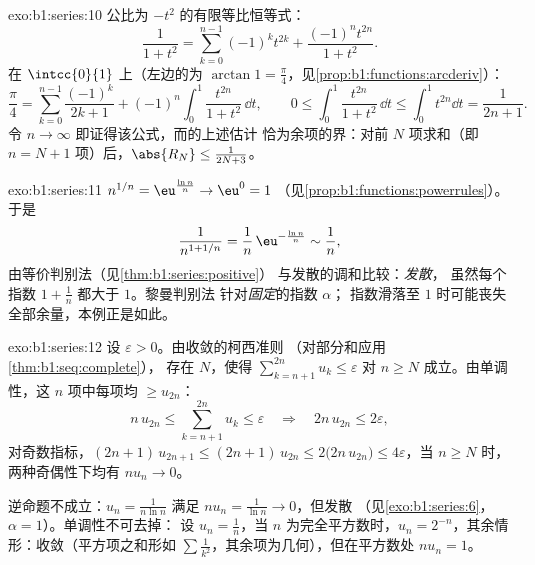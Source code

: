 \begin{solution}{exo:b1:series:10}
公比为 $-t^2$ 的有限等比恒等式：
\[
\frac{1}{1 + t^2} = \sum_{k=0}^{n-1} (-1)^k t^{2k}
+ \frac{(-1)^n t^{2n}}{1 + t^2} .
\]
在 $\intcc{0}{1}$ 上（左边的为 $\arctan
1 = \frac\pi4$，见\cref{prop:b1:functions:arcderiv}）：
\[
\frac{\pi}{4} = \sum_{k=0}^{n-1} \frac{(-1)^k}{2k+1}
+ (-1)^n \int_0^1 \frac{t^{2n}}{1+t^2}\,\dd t,
\qquad
0 \leq \int_0^1 \frac{t^{2n}}{1+t^2}\,\dd t \leq \int_0^1 t^{2n}\dd
t = \frac{1}{2n+1} .
\]
令 $n \to \infty$ 即证得该公式，而的上述估计
恰为余项的界：对前
$N$ 项求和（即 $n = N + 1$ 项）后，$\abs{R_N} \leq \frac{1}{2N + 3}$。
\end{solution}

\begin{solution}{exo:b1:series:11}
$n^{1/n} = \eu^{\frac{\ln n}{n}} \to \eu^0 = 1$
（见\cref{prop:b1:functions:powerrules}）。于是
\[
\frac{1}{n^{1 + 1/n}} = \frac{1}{n}\,\eu^{-\frac{\ln n}{n}}
\sim \frac{1}{n} ,
\]
由等价判别法（见\cref{thm:b1:series:positive}）
与发散的调和比较：\emph{发散}，
虽然每个指数 $1 + \frac1n$ 都大于 $1$。黎曼判别法
针对\emph{固定}的指数 $\alpha$；
指数滑落至 $1$ 时可能丧失全部余量，本例正是如此。
\end{solution}

\begin{solution}{exo:b1:series:12}
设 $\varepsilon > 0$。由收敛的柯西准则
（对部分和应用\cref{thm:b1:seq:complete}），
存在 $N$，使得 $\sum_{k=n+1}^{2n} u_k \leq
\varepsilon$ 对 $n \geq N$ 成立。由单调性，这 $n$ 项中每项均
$\geq u_{2n}$：
\[
n\,u_{2n} \leq \sum_{k=n+1}^{2n} u_k \leq \varepsilon
\quad\Longrightarrow\quad 2n\,u_{2n} \leq 2\varepsilon ,
\]
对奇数指标，$(2n+1)\,u_{2n+1} \leq (2n+1)\,u_{2n} \leq
2\bigl(2n\,u_{2n}\bigr) \leq 4\varepsilon$，当 $n \geq N$ 时，
两种奇偶性下均有 $n u_n \to 0$。

逆命题不成立：$u_n = \frac{1}{n\ln n}$ 满足 $n u_n =
\frac{1}{\ln n} \to 0$，但发散
（见\cref{exo:b1:series:6}，$\alpha = 1$）。单调性不可去掉：
设 $u_n = \frac1n$，当 $n$ 为完全平方数时，$u_n =
2^{-n}$，其余情形：收敛（平方项之和形如
$\sum \frac{1}{k^2}$，其余项为几何），但在平方数处 $n u_n =
1$。
\end{solution}

